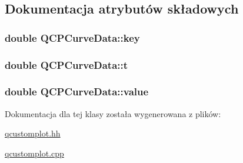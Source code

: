 \subsection{Dokumentacja atrybutów składowych}
\subsubsection[{\texorpdfstring{key}{key}}]{\setlength{\rightskip}{0pt plus 5cm}double Q\+C\+P\+Curve\+Data\+::key}\hypertarget{class_q_c_p_curve_data_a8a4ec5f2b9a396149fd842e309701bd4}{}\label{class_q_c_p_curve_data_a8a4ec5f2b9a396149fd842e309701bd4}
\subsubsection[{\texorpdfstring{t}{t}}]{\setlength{\rightskip}{0pt plus 5cm}double Q\+C\+P\+Curve\+Data\+::t}\hypertarget{class_q_c_p_curve_data_aecc395525be28e9178a088793beb3ff3}{}\label{class_q_c_p_curve_data_aecc395525be28e9178a088793beb3ff3}
\subsubsection[{\texorpdfstring{value}{value}}]{\setlength{\rightskip}{0pt plus 5cm}double Q\+C\+P\+Curve\+Data\+::value}\hypertarget{class_q_c_p_curve_data_a72b39b8e1dbf7b45382ebd48419b6828}{}\label{class_q_c_p_curve_data_a72b39b8e1dbf7b45382ebd48419b6828}


Dokumentacja dla tej klasy została wygenerowana z plików\+:\begin{DoxyCompactItemize}
\item 
\hyperlink{qcustomplot_8hh}{qcustomplot.\+hh}\item 
\hyperlink{qcustomplot_8cpp}{qcustomplot.\+cpp}\end{DoxyCompactItemize}
